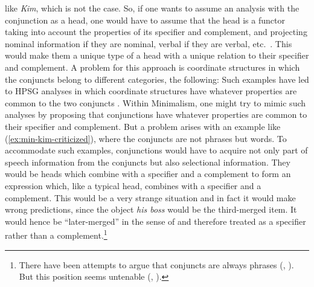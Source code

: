 \documentclass[output=paper
	        ,collection
	        ,collectionchapter
 	        ,biblatex
                ,babelshorthands
                ,newtxmath
                ,draftmode
                ,colorlinks, citecolor=brown
]{langscibook}
\begin{document}
like \emph{Kim}, which is not the case. So, if one wants to assume an analysis with the conjunction
as a head, one would have to assume that the head is a functor taking into account the properties of
its specifier and complement, and projecting nominal information if they are nominal, verbal if they
are verbal, etc.\ \citep{Steedman91a}. This would make them a unique type of a head with a unique 
relation to their specifier and complement. A problem for this approach is coordinate structures in
which the conjuncts belong to different categories, \eg the following: 
\eal
{}\label{ex:min-hobbs-linguist}
\label{ex:min-hobbs-angry}
\zl 
Such examples have led to HPSG analyses in which coordinate structures have whatever properties are
common to the two conjuncts \citep{Sag2003a-u}. Within Minimalism, one might try to mimic such
analyses by proposing that conjunctions have whatever properties are common to their specifier and
complement. But a problem arises with an example like (\ref{ex:min-kim-criticized}), where the conjuncts are
not phrases but words.
\label{ex:min-kim-criticized}
\z
To accommodate such examples, conjunctions would have to acquire not only part of speech information
from the conjuncts but also selectional information. They would be heads which combine with a
specifier and a complement to form an expression which, like a typical head, combines with a
specifier and a complement. This would be a very strange situation and in fact it would make wrong
predictions, since the object \emph{his boss} would be the third-merged item. It would hence be
``later-merged'' in the sense of \citet[]{Chomsky2008a} and therefore treated as a specifier rather than a complement.\footnote{%
	There have been attempts to argue that conjuncts are always phrases (\citealt{Kayne94a-u}, \citealt{Bruening2018a}). But this position seems untenable (\citealt{Abeille2006a}, \citealt[Section~7]{MuellerLexicalism}).%
}
\end{document}
